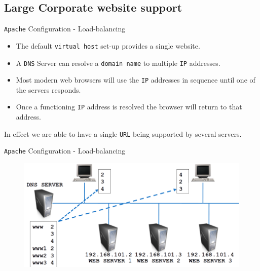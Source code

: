 \documentclass[xcolor=table,aspectratio=169]{beamer}
\begin{document}
\subsection{Large Corporate website support}
\begin{frame}{\texttt{Apache} Configuration - Load-balancing}
  \begin{itemize}
    \item The default \texttt{virtual host} set-up provides a single website.
    \item A \texttt{DNS} Server can resolve a \texttt{domain name} to multiple \texttt{IP} addresses.
    \item Most modern web browsers will use the \texttt{IP} addresses in sequence until one of the servers responds.
    \item Once a functioning \texttt{IP} address is resolved the browser will return to that address.
  \end{itemize}
  \begin{tcolorbox}
    \begin{center}
      \scriptsize In effect we are able to have a single \texttt{URL} being supported by several servers.
    \end{center}
  \end{tcolorbox}
\end{frame}

\begin{frame}{\texttt{Apache} Configuration - Load-balancing}
  \begin{figure}
    \begin{center}
      \includegraphics[width=0.8\linewidth]{LoadBalanced.png}
    \end{center}
  \end{figure}
\end{frame}
\end{document}
